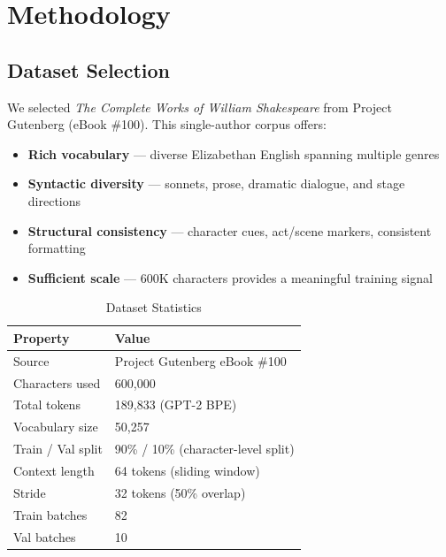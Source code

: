 \documentclass[12pt,a4paper]{article}
\begin{document}
\newpage
\section{Methodology}

\subsection{Dataset Selection}

We selected \textit{The Complete Works of William Shakespeare} from Project Gutenberg (eBook \#100). This single-author corpus offers:

\begin{itemize}[leftmargin=1.8cm]
  \item \textbf{Rich vocabulary} — diverse Elizabethan English spanning multiple genres
  \item \textbf{Syntactic diversity} — sonnets, prose, dramatic dialogue, and stage directions
  \item \textbf{Structural consistency} — character cues, act/scene markers, consistent formatting
  \item \textbf{Sufficient scale} — 600K characters provides a meaningful training signal
\end{itemize}

\begin{table}[H]
\centering
\caption{Dataset Statistics}
\renewcommand{\arraystretch}{1.3}
\begin{tabular}{ll}
  \toprule
  \textbf{Property} & \textbf{Value} \\
  \midrule
  Source             & Project Gutenberg eBook \#100 \\
  Characters used    & 600,000 \\
  Total tokens       & 189,833 (GPT-2 BPE) \\
  Vocabulary size    & 50,257 \\
  Train / Val split  & 90\% / 10\% (character-level split) \\
  Context length     & 64 tokens (sliding window) \\
  Stride             & 32 tokens (50\% overlap) \\
  Train batches      & 82 \\
  Val batches        & 10 \\
  \bottomrule
\end{tabular}
\end{table}
\end{document}
